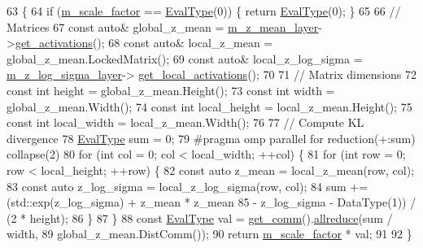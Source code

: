 \begin{DoxyCode}
63                                           \{
64   \textcolor{keywordflow}{if} (\hyperlink{classlbann_1_1objective__function__term_a59a544b8ff0455ed5091de3bf0d81c3c}{m\_scale\_factor} == \hyperlink{base_8hpp_a3266f5ac18504bbadea983c109566867}{EvalType}(0)) \{ \textcolor{keywordflow}{return} \hyperlink{base_8hpp_a3266f5ac18504bbadea983c109566867}{EvalType}(0); \}
65   
66   \textcolor{comment}{// Matrices}
67   \textcolor{keyword}{const} \textcolor{keyword}{auto}& global\_z\_mean = \hyperlink{classlbann_1_1kl__divergence_a7665b4f12f4e842d1850102295c21e3e}{m\_z\_mean\_layer}->\hyperlink{classlbann_1_1Layer_a1134b1a4385af199d7272c5aa827fa99}{get\_activations}();
68   \textcolor{keyword}{const} \textcolor{keyword}{auto}& local\_z\_mean = global\_z\_mean.LockedMatrix();
69   \textcolor{keyword}{const} \textcolor{keyword}{auto}& local\_z\_log\_sigma = \hyperlink{classlbann_1_1kl__divergence_aae1f6deb97728e09771840f447a571b1}{m\_z\_log\_sigma\_layer}->
      \hyperlink{classlbann_1_1Layer_a4248f27acebf72b7b7b3ee39c8bcb62a}{get\_local\_activations}();
70   
71   \textcolor{comment}{// Matrix dimensions}
72   \textcolor{keyword}{const} \textcolor{keywordtype}{int} height = global\_z\_mean.Height();
73   \textcolor{keyword}{const} \textcolor{keywordtype}{int} width = global\_z\_mean.Width();
74   \textcolor{keyword}{const} \textcolor{keywordtype}{int} local\_height = local\_z\_mean.Height();
75   \textcolor{keyword}{const} \textcolor{keywordtype}{int} local\_width = local\_z\_mean.Width();
76 
77   \textcolor{comment}{// Compute KL divergence}
78   \hyperlink{base_8hpp_a3266f5ac18504bbadea983c109566867}{EvalType} sum = 0;
79 \textcolor{preprocessor}{  #pragma omp parallel for reduction(+:sum) collapse(2)}
80   \textcolor{keywordflow}{for} (\textcolor{keywordtype}{int} col = 0; col < local\_width; ++col) \{
81     \textcolor{keywordflow}{for} (\textcolor{keywordtype}{int} row = 0; row < local\_height; ++row) \{
82       \textcolor{keyword}{const} \textcolor{keyword}{auto} z\_mean = local\_z\_mean(row, col);
83       \textcolor{keyword}{const} \textcolor{keyword}{auto} z\_log\_sigma = local\_z\_log\_sigma(row, col);
84       sum += (std::exp(z\_log\_sigma) + z\_mean * z\_mean
85               - z\_log\_sigma - DataType(1)) / (2 * height);
86     \}
87   \}
88   \textcolor{keyword}{const} \hyperlink{base_8hpp_a3266f5ac18504bbadea983c109566867}{EvalType} val = \hyperlink{classlbann_1_1objective__function__term_a5f89b676a26a6b76ddc26563ac87beb9}{get\_comm}().\hyperlink{classlbann_1_1lbann__comm_af5631e5f0f54e4df4958eba9df2599ef}{allreduce}(sum / width,
89                                             global\_z\_mean.DistComm());
90   \textcolor{keywordflow}{return} \hyperlink{classlbann_1_1objective__function__term_a59a544b8ff0455ed5091de3bf0d81c3c}{m\_scale\_factor} * val;
91 
92 \}
\end{DoxyCode}
